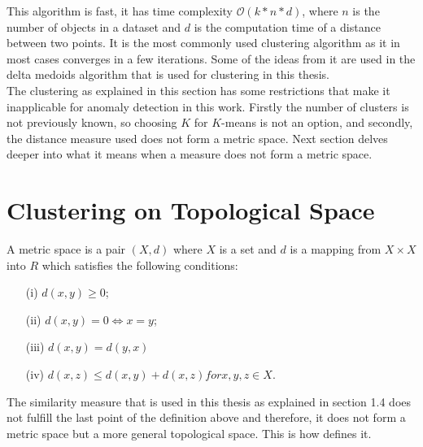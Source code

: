 \documentclass[thesis=B,english]{FITthesis}[2012/10/20]
\begin{document}
This algorithm is fast, it has time complexity $\mathcal{O}(k*n*d)$, where $n$ is the number of objects in a dataset and $d$ is the computation time of a distance between two points.
It is the most commonly used clustering algorithm as it in most cases converges in a few iterations.
Some of the ideas from it are used in the delta medoids algorithm that is used for clustering in this thesis. \\
                                                                                  
The clustering as explained in this section has some restrictions that make it inapplicable for anomaly detection in this work.
Firstly the number of clusters is not previously known, so choosing $K$ for $K$-means is not an option, and secondly, the distance measure used does not form a metric space.
Next section delves deeper into what it means when a measure does not form a metric space.
                                                                                  
\section{Clustering on Topological Space}\label{sec:cluster_topo}

A metric space is a pair $(X, d)$ where $X$ is a set and $d$ is a mapping from $X \times X$ into $R$ which satisfies the following conditions:
\begin{enumerate}                                                                 
    \item [(i)] $d(x, y) \geq 0$;                                                 
    \item [(ii)] $d(x, y) = 0 \iff x = y$;                                        
    \item [(iii)] $d(x, y) = d(y, x)$                                             
    \item [(iv)] $d(x, z) \leq d(x, y) + d(x, z) for x, y, z \in X$.              
\end{enumerate}                                                                   
                                                                                  
The similarity measure that is used in this thesis as explained in section 1.4  does not fulfill the last point of the definition above and therefore, it does not form a metric space but a more general topological space. This is how \cite{stahl2014introduction} defines it. \\
\end{document}

